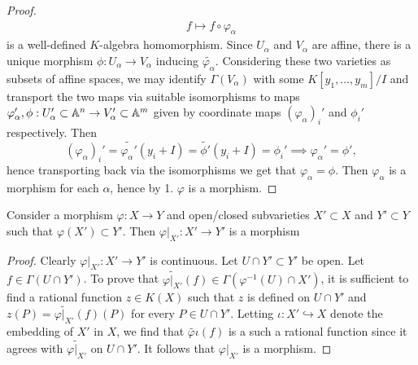 \begin{proof}
\begin{gather*}
            f\mapsto f\circ \varphi_\alpha
        \end{gather*}
        is a well-defined $K$-algebra homomorphism. Since $U_\alpha$ and $V_\alpha$ are affine, there is a unique morphism $\phi: U_\alpha\rightarrow V_\alpha$ inducing $\widetilde{\varphi_\alpha}$. Considering these two varieties as subsets of affine spaces, we may identify $\Gamma(V_\alpha)$ with some $K[y_1,\dots,y_m]/I$ and transport the two maps via suitable isomorphisms to maps $\varphi_\alpha',\phi : U_\alpha'\subset \mathbb{A}^n \rightarrow V_\alpha'\subset \mathbb{A}^m$ given by coordinate maps $(\varphi_\alpha)_i'$ and $\phi_i'$ respectively. Then 
        $$(\varphi_\alpha)_i'=\widetilde{\varphi_\alpha'}(y_i+I)=\widetilde{\phi'}(y_i+I)=\phi_i'\implies \varphi_\alpha'=\phi',$$
        hence transporting back via the isomorphisms we get that $\varphi_\alpha=\phi$. Then $\varphi_\alpha$ is a morphism for each $\alpha$, hence by 1. $\varphi$ is a morphism. 
    \end{proof}
    \begin{lemma}\label{RestrictionOfAMorphismToVarietiesIsAMorphism}
        Consider a morphism $\varphi: X\rightarrow Y$ and open/closed subvarieties $X'\subset X$ and $Y'\subset Y$ such that $\varphi(X')\subset Y'$. Then $\left. \varphi\right|_{X'} : X'\rightarrow Y'$ is a morphism
    \end{lemma}
    \begin{proof}
        Clearly $\left. \varphi\right|_{X'} : X'\rightarrow Y'$ is continuous. Let $U\cap Y'\subset Y'$ be open.  Let $f\in \Gamma(U\cap Y')$. To prove that $\widetilde{\left.\varphi\right|_{X'}}(f)\in \Gamma(\varphi^{-1}(U)\cap X')$, it is sufficient to find a rational function $z\in K(X)$ such that $z$ is defined on $U\cap Y'$ and $z(P)=\widetilde{\left.\varphi\right|_{X'}}(f)(P)$ for every $P\in U\cap Y'$. Letting $\iota : X'\hookrightarrow X$ denote the embedding of $X'$ in $X$, we find that $\widetilde{\varphi\iota}(f)$ is a such a rational function since it agrees with $\widetilde{\left.\varphi\right|_{X'}}$ on $U\cap Y'$. It follows that $\left.\varphi\right|_{X'}$ is a morphism.
    \end{proof}
